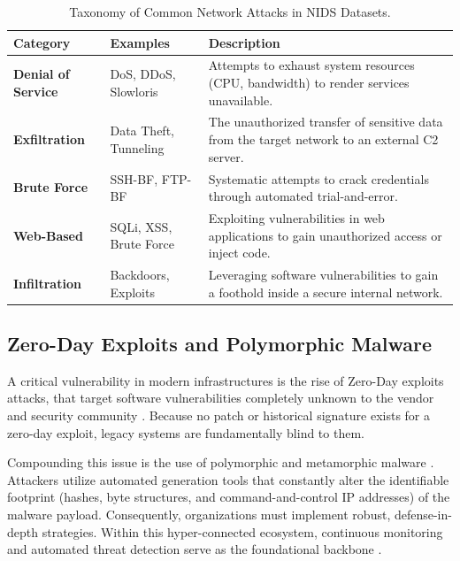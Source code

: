 \documentclass[12pt, a4paper]{report}
\begin{document}
\begin{table}[H]
\centering
\caption{Taxonomy of Common Network Attacks in NIDS Datasets.}
\label{tab:attack_types}
\begin{tabular}{@{}llp{8cm}@{}}
\toprule
\textbf{Category} & \textbf{Examples} & \textbf{Description} \\ \midrule
\textbf{Denial of Service} & DoS, DDoS, Slowloris & Attempts to exhaust system resources (CPU, bandwidth) to render services unavailable. \\
\textbf{Exfiltration} & Data Theft, Tunneling & The unauthorized transfer of sensitive data from the target network to an external C2 server. \\
\textbf{Brute Force} & SSH-BF, FTP-BF & Systematic attempts to crack credentials through automated trial-and-error. \\
\textbf{Web-Based} & SQLi, XSS, Brute Force & Exploiting vulnerabilities in web applications to gain unauthorized access or inject code. \\
\textbf{Infiltration} & Backdoors, Exploits & Leveraging software vulnerabilities to gain a foothold inside a secure internal network. \\ \bottomrule
\end{tabular}
\end{table}

\subsection{Zero-Day Exploits and Polymorphic Malware}
A critical vulnerability in modern infrastructures is the rise of Zero-Day exploits attacks, that target software vulnerabilities completely unknown to the vendor and security community \cite{bilge2012before}. Because no patch or historical signature exists for a zero-day exploit, legacy systems are fundamentally blind to them. 

Compounding this issue is the use of polymorphic and metamorphic malware \cite{szor2005art} . Attackers utilize automated generation tools that constantly alter the identifiable footprint (hashes, byte structures, and command-and-control IP addresses) of the malware payload. Consequently, organizations must implement robust, defense-in-depth strategies. Within this hyper-connected ecosystem, continuous monitoring and automated threat detection serve as the foundational backbone \cite{hairab2022anomaly}.
\end{document}
